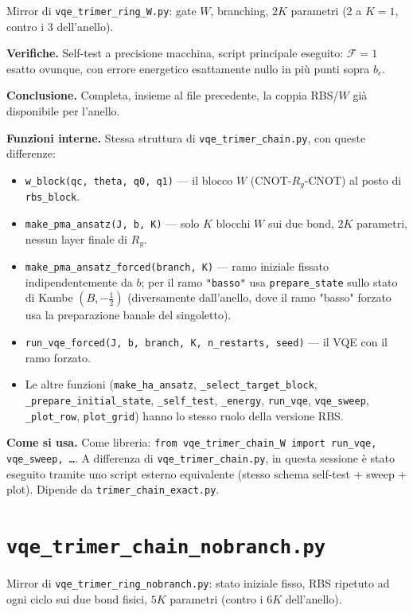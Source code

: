 \documentclass[11pt,a4paper]{article}
\begin{document}
Mirror di \texttt{vqe\_trimer\_ring\_W.py}: gate $W$, branching, $2K$ parametri (2 a
$K=1$, contro i 3 dell'anello).

\textbf{Verifiche.} Self-test a precisione macchina, script principale eseguito:
$\mathcal F=1$ esatto ovunque, con errore energetico esattamente nullo in più punti
sopra $b_c$.

\textbf{Conclusione.} Completa, insieme al file precedente, la coppia RBS/$W$ già
disponibile per l'anello.

\textbf{Funzioni interne.} Stessa struttura di \texttt{vqe\_trimer\_chain.py}, con
queste differenze:
\begin{itemize}
\item \texttt{w\_block(qc,\ theta,\ q0,\ q1)} — il blocco $W$ (CNOT-$R_y$-CNOT) al
posto di \texttt{rbs\_block}.
\item \texttt{make\_pma\_ansatz(J,\ b,\ K)} — solo $K$ blocchi $W$ sui due bond,
$2K$ parametri, nessun layer finale di $R_y$.
\item \texttt{make\_pma\_ansatz\_forced(branch,\ K)} — ramo iniziale fissato
indipendentemente da $b$; per il ramo \texttt{"basso"} usa
\texttt{prepare\_state} sullo stato di Kambe $(B,-\tfrac12)$ (diversamente
dall'anello, dove il ramo "basso" forzato usa la preparazione banale del
singoletto).
\item \texttt{run\_vqe\_forced(J,\ b,\ branch,\ K,\ n\_restarts,\ seed)} — il VQE
con il ramo forzato.
\item Le altre funzioni (\texttt{make\_ha\_ansatz}, \texttt{\_select\_target\_block},
\texttt{\_prepare\_initial\_state}, \texttt{\_self\_test}, \texttt{\_energy},
\texttt{run\_vqe}, \texttt{vqe\_sweep}, \texttt{\_plot\_row}, \texttt{plot\_grid})
hanno lo stesso ruolo della versione RBS.
\end{itemize}

\textbf{Come si usa.} Come libreria: \texttt{from vqe\_trimer\_chain\_W import
run\_vqe, vqe\_sweep, \ldots}. A differenza di \texttt{vqe\_trimer\_chain.py}, in
questa sessione è stato eseguito tramite uno script esterno equivalente (stesso
schema self-test + sweep + plot). Dipende da \texttt{trimer\_chain\_exact.py}.

\section*{\texttt{vqe\_trimer\_chain\_nobranch.py}}

Mirror di \texttt{vqe\_trimer\_ring\_nobranch.py}: stato iniziale fisso, RBS ripetuto
ad ogni ciclo sui due bond fisici, $5K$ parametri (contro i $6K$ dell'anello).
\end{document}
